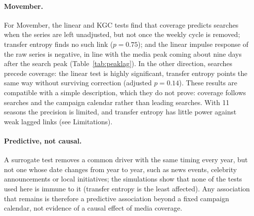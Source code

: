 \documentclass[11pt,a4paper]{article}
\begin{document}
\paragraph{Movember.} For Movember, the linear and KGC tests find that coverage predicts searches when the series are left unadjusted, but not once the weekly cycle is removed; transfer entropy finds no such link ($p=0.75$); and the linear impulse response of the raw series is negative, in line with the media peak coming about nine days after the search peak (Table~\ref{tab:peaklag}). In the other direction, searches precede coverage: the linear test is highly significant, transfer entropy points the same way without surviving correction (adjusted $p=0.14$). These results are compatible with a simple description, which they do not prove: coverage follows searches and the campaign calendar rather than leading searches. With 11 seasons the precision is limited, and transfer entropy has little power against weak lagged links (see Limitations).

\paragraph{Predictive, not causal.} A surrogate test removes a common driver with the same timing every year, but not one whose date changes from year to year, such as news events, celebrity announcements or local initiatives; the simulations show that none of the tests used here is immune to it (transfer entropy is the least affected). Any association that remains is therefore a predictive association beyond a fixed campaign calendar, not evidence of a causal effect of media coverage.
\end{document}
